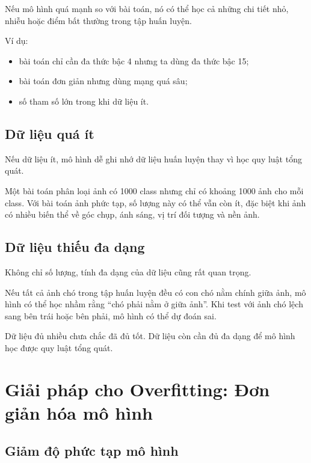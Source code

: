 \documentclass[12pt,a4paper]{report}
\begin{document}
Nếu mô hình quá mạnh so với bài toán, nó có thể học cả những chi tiết nhỏ, nhiễu hoặc điểm bất thường trong tập huấn luyện.

Ví dụ:

\begin{itemize}
    \item bài toán chỉ cần đa thức bậc 4 nhưng ta dùng đa thức bậc 15;
    \item bài toán đơn giản nhưng dùng mạng quá sâu;
    \item số tham số lớn trong khi dữ liệu ít.
\end{itemize}

\section{Dữ liệu quá ít}

Nếu dữ liệu ít, mô hình dễ ghi nhớ dữ liệu huấn luyện thay vì học quy luật tổng quát.

\begin{vidu}
Một bài toán phân loại ảnh có 1000 class nhưng chỉ có khoảng 1000 ảnh cho mỗi class. Với bài toán ảnh phức tạp, số lượng này có thể vẫn còn ít, đặc biệt khi ảnh có nhiều biến thể về góc chụp, ánh sáng, vị trí đối tượng và nền ảnh.
\end{vidu}

\section{Dữ liệu thiếu đa dạng}

Không chỉ số lượng, tính đa dạng của dữ liệu cũng rất quan trọng.

Nếu tất cả ảnh chó trong tập huấn luyện đều có con chó nằm chính giữa ảnh, mô hình có thể học nhầm rằng ``chó phải nằm ở giữa ảnh''. Khi test với ảnh chó lệch sang bên trái hoặc bên phải, mô hình có thể dự đoán sai.

\begin{ghinho}
Dữ liệu đủ nhiều chưa chắc đã đủ tốt. Dữ liệu còn cần đủ đa dạng để mô hình học được quy luật tổng quát.
\end{ghinho}

\chapter{Giải pháp cho Overfitting: Đơn giản hóa mô hình}

\section{Giảm độ phức tạp mô hình}
\end{document}
